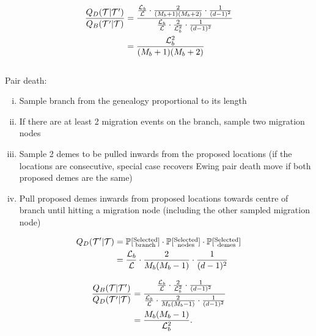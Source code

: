 	\begin{align*}
		\frac{Q_D(\mathcal{T} | \mathcal{T}')}{Q_B(\mathcal{T}' | \mathcal{T})} & = \frac{\frac{\mathcal{L}_b}{\mathcal{L}} \cdot \frac{2}{(M_b + 1)(M_b + 2)} \cdot \frac{1}{(d-1)^2}}{\frac{\mathcal{L}_b}{\mathcal{L}} \cdot \frac{2}{\mathcal{L}_b^2} \cdot \frac{1}{(d-1)^2}} \\
		& = \frac{\mathcal{L}_b^2}{(M_b + 1) (M_b + 2)}
	\end{align*}
	\\[2ex]
	
	Pair death:
	\begin{enumerate}[(i)]
		\item Sample branch from the genealogy proportional to its length
		\item If there are at least 2 migration events on the branch, sample two migration nodes
		\item Sample 2 demes to be pulled inwards from the proposed locations (if the locations are consecutive, special case recovers Ewing pair death move if both proposed demes are the same)
		\item Pull proposed demes inwards from proposed locations towards centre of branch until hitting a migration node (including the other sampled migration node)
	\end{enumerate}
	\begin{align*}
		Q_D (\mathcal{T}' | \mathcal{T}) & = \mathbb{P}[\substack{\text{Selected} \\ \text{branch}}] \cdot \mathbb{P}[\substack{\text{Selected} \\ \text{nodes}}] \cdot \mathbb{P}[\substack{\text{Selected} \\ \text{demes}}] \\
		& = \frac{\mathcal{L}_b}{\mathcal{L}} \cdot \frac{2}{M_b (M_b - 1)} \cdot \frac{1}{(d-1)^2}
	\end{align*}
	
	\begin{align*}
		\frac{Q_B(\mathcal{T} | \mathcal{T}')}{Q_D (\mathcal{T}' | \mathcal{T})} & = \frac{\frac{\mathcal{L}_b}{\mathcal{L}} \cdot \frac{2}{\mathcal{L}_b^2} \cdot \frac{1}{(d-1)^2}}{\frac{\mathcal{L}_b}{\mathcal{L}} \cdot \frac{2}{M_b (M_b - 1)} \cdot \frac{1}{(d-1)^2}} \\
		& = \frac{M_b (M_b - 1)}{\mathcal{L}_b^2}.
	\end{align*}